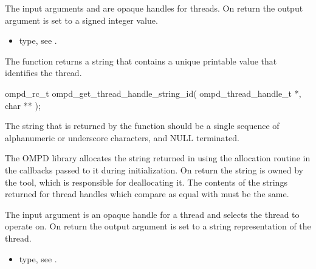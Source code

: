 \argdesc
The input arguments  and  are opaque handles for threads.
On return the output argument  is set to a signed integer value.

\crossreferences
\begin{itemize}
	\item {} type, see .
\end{itemize}

\label{subsubsubsec:ompd_get_thread_handle_string_id}
\summary
The  function returns a string
that contains a unique printable value that identifies the thread.

\format

\begin{cspecific}
\begin{ompSyntax}
ompd_rc_t ompd_get_thread_handle_string_id(
  ompd_thread_handle_t *,
  char **
);
\end{ompSyntax}
\end{cspecific}


\descr
The string that is returned by the function should be a single sequence of alphanumeric or 
underscore characters, and NULL terminated.

The OMPD library allocates the string returned in  using the allocation 
routine in the callbacks passed to it during initialization. On return the string is owned by the 
tool, which is responsible for deallocating it. The contents of the strings returned for thread 
handles which compare as equal with  must be the same.

\argdesc
The input argument  is an opaque handle for a thread  and selects the thread to operate on.
On return the output argument  is set to a string representation of the thread.


\crossreferences
\begin{itemize}
	\item {} type, see .
\end{itemize}

